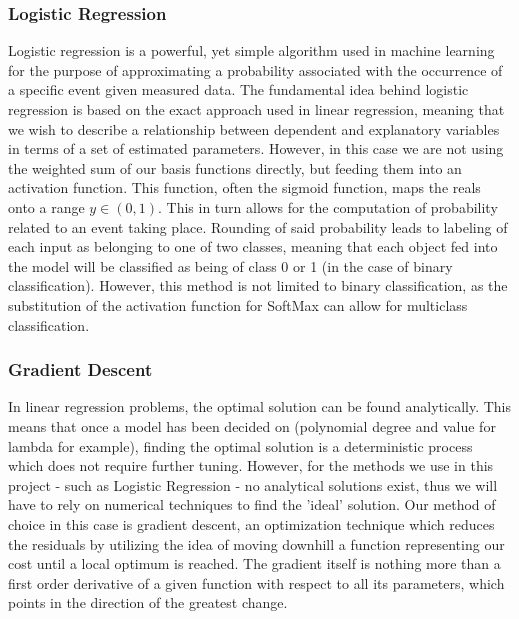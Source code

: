 \documentclass[onecolumn,10pt,cleanfoot]{asme2ej}
\begin{document}

\subsubsection{Logistic Regression}

Logistic regression is a powerful, yet simple algorithm used in machine learning for the purpose of approximating a probability associated with the occurrence of a specific event given measured data. The fundamental idea behind logistic regression is based on the exact approach used in linear regression, meaning that we wish to describe a relationship between dependent and explanatory variables in terms of a set of estimated parameters. However, in this case we are not using the weighted sum of our basis functions directly, but feeding them into an activation function. This function, often the sigmoid function, maps the reals onto a range $y \in (0,1)$. This in turn allows for the computation of probability related to an event taking place. Rounding of said probability leads to labeling of each input as belonging to one of two classes, meaning that each object fed into the model will be classified as being of class 0 or 1 (in the case of binary classification). However, this method is not limited to binary classification, as the substitution of the activation function for SoftMax can allow for multiclass classification.

\subsubsection{Gradient Descent}

In linear regression problems, the optimal solution can be found analytically. This means that once a model has been decided on (polynomial degree and value for lambda for example), finding the optimal solution is a deterministic process which does not require further tuning. However, for the methods we use in this project - such as Logistic Regression - no analytical solutions exist, thus we will have to rely on numerical techniques to find the 'ideal' solution. Our method of choice in this case is gradient descent, an optimization technique which reduces the residuals by utilizing the idea of moving downhill a function representing our cost until a local optimum is reached. The gradient itself is nothing more than a first order derivative of a given function with respect to all its parameters, which points in the direction of the greatest change.
\end{document}
